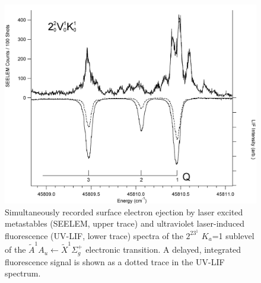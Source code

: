 \documentclass[12pt,draft]{mitthesis}
\begin{document}
\begin{figure}
  \caption{
    Simultaneously recorded surface electron ejection by laser excited
    metastables (SEELEM, upper trace) and ultraviolet laser-induced
    fluorescence (UV-LIF, lower trace) spectra of the $2^23^1$ $K_a$=1
    sublevel of the $\tilde{A}^1A_u \leftarrow \tilde{X} ^1\Sigma_g^+$
    electronic transition. A delayed, integrated fluorescence signal
    is shown as a dotted trace in the UV-LIF spectrum.}
  \label{fig:spectrum-2231-q123}
  \centering
  \includegraphics[width=6in]{spectrum-2231-Q123.png}
\end{figure}
\end{document}
